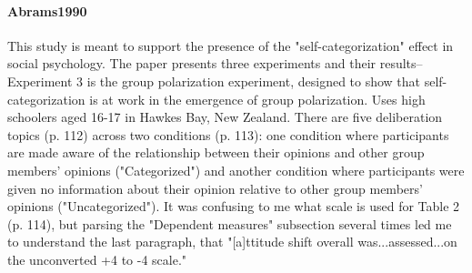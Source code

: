 \documentclass[11pt, letterpaper]{article}
\begin{document}
\paragraph{{Abrams1990}} This study is meant to support the presence of the "self-categorization" effect in
social psychology. The paper presents three experiments and their results--Experiment 3 is the group polarization
experiment, designed to show that self-categorization is at work in the emergence of group polarization. Uses high
schoolers aged 16-17 in Hawkes Bay, New Zealand. There are five deliberation topics (p. 112) across two conditions
(p. 113): one condition where participants are made aware of the relationship between their opinions and other group
members' opinions ("Categorized") and another condition where participants were given no information about their
opinion relative to other group members' opinions ("Uncategorized"). It was confusing to me what scale is used for
Table 2 (p. 114), but parsing the "Dependent measures" subsection several times led me to understand the last
paragraph, that "[a]ttitude shift overall was...assessed...on the unconverted +4 to -4 scale."
\end{document}
